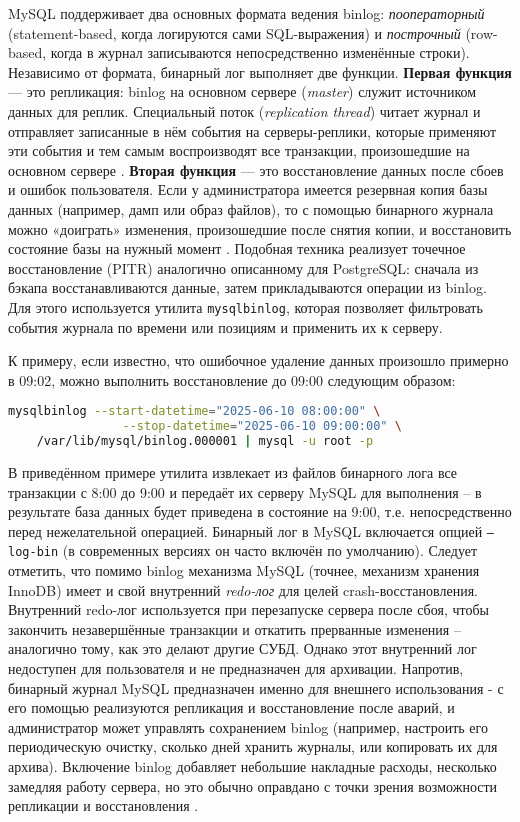  MySQL поддерживает два основных формата ведения binlog: \textit{пооператорный} (statement-based, когда логируются сами SQL-выражения) и \textit{построчный} (row-based, когда в журнал записываются непосредственно изменённые строки). Независимо от формата, бинарный лог выполняет две функции. \textbf{Первая функция} — это репликация: binlog на основном сервере (\textit{master}) служит источником данных для реплик. Специальный поток (\textit{replication thread}) читает журнал и отправляет записанные в нём события на серверы-реплики, которые применяют эти события и тем самым воспроизводят все транзакции, произошедшие на основном сервере \autocite{Mysqldoc7}. \textbf{Вторая функция} — это восстановление данных после сбоев и ошибок пользователя. Если у администратора имеется резервная копия базы данных (например, дамп или образ файлов), то с помощью бинарного журнала можно «доиграть» изменения, произошедшие после снятия копии, и восстановить состояние базы на нужный момент \autocite{Mysqldoc7}. Подобная техника реализует точечное восстановление (PITR) аналогично описанному для PostgreSQL: сначала из бэкапа восстанавливаются данные, затем прикладываются операции из binlog. Для этого используется утилита \texttt{mysqlbinlog}, которая позволяет фильтровать события журнала по времени или позициям и применить их к серверу. 
 
 К примеру, если известно, что ошибочное удаление данных произошло примерно в 09:02, можно выполнить восстановление до 09:00 следующим образом:

 \begin{lstlisting}[language=bash]
    mysqlbinlog --start-datetime="2025-06-10 08:00:00" \
                --stop-datetime="2025-06-10 09:00:00" \
    /var/lib/mysql/binlog.000001 | mysql -u root -p
 \end{lstlisting}
 
 В приведённом примере утилита извлекает из файлов бинарного лога все транзакции с 8:00 до 9:00 и передаёт их серверу MySQL для выполнения – в результате база данных будет приведена в состояние на 9:00, т.е. непосредственно перед нежелательной операцией. Бинарный лог в MySQL включается опцией \texttt{--log-bin} (в современных версиях он часто включён по умолчанию). Следует отметить, что помимо binlog механизма MySQL (точнее, механизм хранения InnoDB) имеет и свой внутренний \textit{redo-лог} для целей crash-восстановления. Внутренний redo-лог используется при перезапуске сервера после сбоя, чтобы закончить незавершённые транзакции и откатить прерванные изменения – аналогично тому, как это делают другие СУБД. Однако этот внутренний лог недоступен для пользователя и не предназначен для архивации. Напротив, бинарный журнал MySQL предназначен именно для внешнего использования - с его помощью реализуются репликация и восстановление после аварий, и администратор может управлять сохранением binlog (например, настроить его периодическую очистку, сколько дней хранить журналы, или копировать их для архива). Включение binlog добавляет небольшие накладные расходы, несколько замедляя работу сервера, но это обычно оправдано с точки зрения возможности репликации и восстановления \autocite{Mysqldoc7}. 
 
